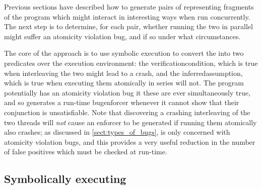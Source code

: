 Previous sections have described how to generate pairs of
{\StateMachines} representing fragments of the program which might
interact in interesting ways when run concurrently.  The next step is
to determine, for each pair, whether running the two {\StateMachines}
in parallel might suffer an atomicity violation bug, and if so under
what circumstances.

The core of the approach is to use symbolic execution\cite{King1976}
to convert the {\StateMachines} into two predicates over the
{\StateMachine} execution environment: the
\gls{verificationcondition}, which is true when interleaving the two
    {\StateMachines} might lead to a crash, and the
    \gls{inferredassumption}, which is true when executing them
    atomically in series will not.  The program potentially has an
    atomicity violation bug it these are ever simultaneously true, and
    so {\technique} generates a run-time \gls{bugenforcer} whenever it
    cannot show that their conjunction is unsatisfiable.  Note that
    discovering a crashing interleaving of the two threads will
    \emph{not} cause an enforcer to be generated if running them
    atomically also crashes; as discussed in
    \autoref{sect:types_of_bugs}, {\technique} is only concerned with
    atomicity violation bugs, and this provides a very useful
    reduction in the number of false positives which must be checked
    at run-time.

\subsection{Symbolically executing {\StateMachines}}
\label{sect:derive:symbolic_execute}

